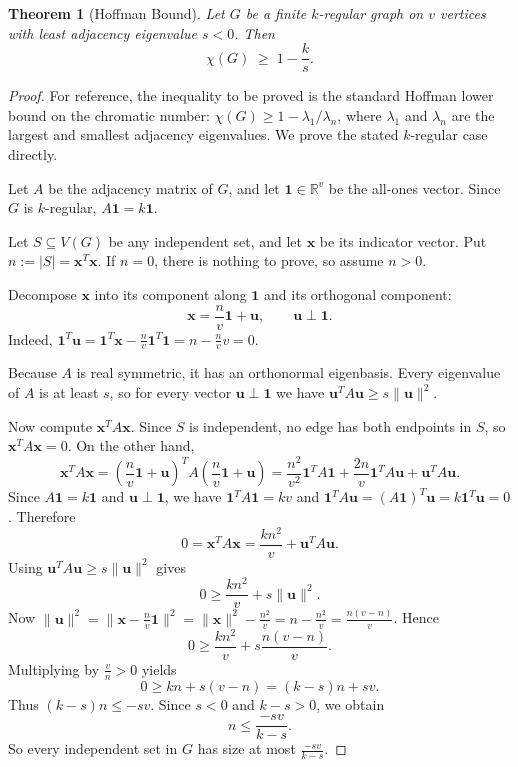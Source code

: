 \documentclass{article}
\newtheorem{theorem}{Theorem}[section]
\theoremstyle{definition}
\begin{document}
\begin{theorem}[Hoffman Bound]
\label{thm:hoffman}
Let $G$ be a finite $k$-regular graph on $v$ vertices with least adjacency eigenvalue $s<0$. Then
\[
  \chi(G) \;\ge\; 1-\frac{k}{s}.
\]
\end{theorem}

\begin{proof}
For reference, the inequality to be proved is the standard Hoffman lower bound on the chromatic number: $\chi(G)\ge 1-\lambda_{1}/\lambda_{n}$, where $\lambda_{1}$ and $\lambda_{n}$ are the largest and smallest adjacency eigenvalues. We prove the stated $k$-regular case directly.

Let $A$ be the adjacency matrix of $G$, and let $\mathbf{1}\in\mathbb{R}^{v}$ be the all-ones vector. Since $G$ is $k$-regular, $A\mathbf{1}=k\mathbf{1}$.

Let $S\subseteq V(G)$ be any independent set, and let $\mathbf{x}$ be its indicator vector. Put $n:=|S|=\mathbf{x}^{T}\mathbf{x}$. If $n=0$, there is nothing to prove, so assume $n>0$.

Decompose $\mathbf{x}$ into its component along $\mathbf{1}$ and its orthogonal component:
\[
\mathbf{x}=\frac{n}{v}\mathbf{1}+\mathbf{u},\qquad \mathbf{u}\perp \mathbf{1}.
\]
Indeed, $\mathbf{1}^{T}\mathbf{u}=\mathbf{1}^{T}\mathbf{x}-\frac{n}{v}\mathbf{1}^{T}\mathbf{1}=n-\frac{n}{v}v=0$.

Because $A$ is real symmetric, it has an orthonormal eigenbasis. Every eigenvalue of $A$ is at least $s$, so for every vector $\mathbf{u}\perp \mathbf{1}$ we have $\mathbf{u}^{T}A\mathbf{u}\ge s\|\mathbf{u}\|^{2}$.

Now compute $\mathbf{x}^{T}A\mathbf{x}$. Since $S$ is independent, no edge has both endpoints in $S$, so $\mathbf{x}^{T}A\mathbf{x}=0$. On the other hand,
\[
\mathbf{x}^{T}A\mathbf{x}
=\left(\frac{n}{v}\mathbf{1}+\mathbf{u}\right)^{T}A\left(\frac{n}{v}\mathbf{1}+\mathbf{u}\right)
=\frac{n^{2}}{v^{2}}\mathbf{1}^{T}A\mathbf{1}+\frac{2n}{v}\mathbf{1}^{T}A\mathbf{u}+\mathbf{u}^{T}A\mathbf{u}.
\]
Since $A\mathbf{1}=k\mathbf{1}$ and $\mathbf{u}\perp\mathbf{1}$, we have $\mathbf{1}^{T}A\mathbf{1}=kv$ and $\mathbf{1}^{T}A\mathbf{u}=(A\mathbf{1})^{T}\mathbf{u}=k\mathbf{1}^{T}\mathbf{u}=0$.
Therefore
\[
0=\mathbf{x}^{T}A\mathbf{x}=\frac{kn^{2}}{v}+\mathbf{u}^{T}A\mathbf{u}.
\]
Using $\mathbf{u}^{T}A\mathbf{u}\ge s\|\mathbf{u}\|^{2}$ gives
\[
0\ge\frac{kn^{2}}{v}+s\|\mathbf{u}\|^{2}.
\]
Now $\|\mathbf{u}\|^{2}=\|\mathbf{x}-\frac{n}{v}\mathbf{1}\|^{2}=\|\mathbf{x}\|^{2}-\frac{n^{2}}{v}=n-\frac{n^{2}}{v}=\frac{n(v-n)}{v}$.
Hence
\[
0\ge\frac{kn^{2}}{v}+s\frac{n(v-n)}{v}.
\]
Multiplying by $\frac{v}{n}>0$ yields
\[
0\ge kn+s(v-n)=(k-s)n+sv.
\]
Thus $(k-s)n\le -sv$. Since $s<0$ and $k-s>0$, we obtain
\[
n\le \frac{-sv}{k-s}.
\]
So every independent set in $G$ has size at most $\frac{-sv}{k-s}$.


\end{proof}
\end{document}
